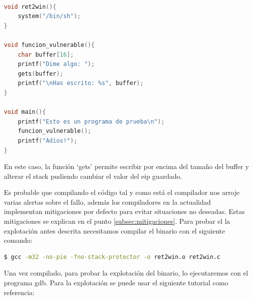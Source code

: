 \begin{lstlisting}[language=C, caption=Código vulnerable con función ret2win]

void ret2win(){
    system("/bin/sh");
}

void funcion_vulnerable(){
    char buffer[16];
    printf("Dime algo: ");
    gets(buffer);
    printf("\nHas escrito: %s", buffer);
}

void main(){
    printf("Esto es un programa de prueba\n");
    funcion_vulnerable();
    printf("Adios!");
}
\end{lstlisting}
\FloatBarrier
En este caso, la función `gets' permite escribir por encima del tamaño del buffer y alterar el stack pudiendo cambiar el valor del \acrshort{eip} guardado.

Es probable que compilando el código tal y como está el compilador nos arroje varias alertas sobre el fallo, además los compiladores en la actualidad implementan mitigaciones por defecto para evitar situaciones no deseadas.
Estas mitigaciones se explican en el punto \ref{subsec:mitigaciones}.
Para probar el la explotación antes descrita necesitamos compilar el binario con el siguiente comando:
\begin{lstlisting}[language=bash, caption=Compilado de código con pocas mitigaciones y arquitectura 32bit]
$ gcc -m32 -no-pie -fno-stack-protector -o ret2win.o ret2win.c
\end{lstlisting}
Una vez compilado, para probar la explotación del binario, lo ejecutaremos con el programa \acrfull{gdb}.
Para la explotación se puede usar el siguiente tutorial como referencia:
